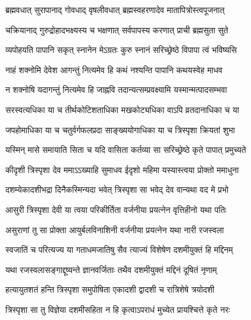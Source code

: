 \twolineshloka
{ब्रह्मवधात् सुरापानाद् गोवधाद् वृषलीवधात्}
{ब्रह्मस्वहरणादेव मातापित्रोस्त्वपूजनात्}%

\twolineshloka
{चक्रियानाद् गुरुद्रोहादभक्ष्यस्य च भक्षणात्}
{सर्वपापस्य करणात् प्राची ब्रह्मसुता सुते}%

\twolineshloka
{व्यपोहयति पापानि सकृत् स्नानेन मेऽग्रतः}
{कुरु स्नानं सरिच्छ्रेष्ठे विपापा त्वं भविष्यसि}%


\twolineshloka
{नाहं शक्नोमि देवेश आगन्तुं नित्यमेव हि}
{कथं नश्यन्ति पापानि कथयस्वेह माधव}%


\twolineshloka
{न शक्नोषि यदागन्तुं नित्यमेव हि जाह्नवि}
{तदान्यत्सम्प्रवक्ष्यामि यस्मान्मत्पादसम्भवा}%

\twolineshloka
{सरस्वत्यधिका या च तीर्थकोटिशताधिका}
{मखकोट्यधिका वाऽपि व्रतदानाधिका च या}%

\twolineshloka
{जपहोमाधिका या च चतुर्वर्गफलप्रदा}
{साङ्ख्ययोगाधिका या च त्रिस्पृशा क्रियतां शुभा}%

\twolineshloka
{यस्मिन् मासे समायाति सिता च यदि वासिता}
{कर्तव्या सा सरिच्छ्रेष्ठे कृते पापात् प्रमुच्यते}%


\twolineshloka
{कीदृशी त्रिस्पृशा देव ममाऽऽख्याहि सुमाधव}
{ईदृशो महिमा यस्यास्त्वया प्रोक्तो ममाधुना}%

\twolineshloka
{दशम्येकादशीभद्रा दिनैकस्मिन्यदा भवेत्}
{त्रिस्पृशा सा भवेद् देव वान्यथा वद मे प्रभो}%


\twolineshloka
{आसुरी त्रिस्पृशा देवी या त्वया परिकीर्तिता}
{वर्जनीया प्रयत्नेन वृत्तिहीनो यथा पतिः}%

\twolineshloka
{असुराणां तु सा प्रोक्ता आयुर्बलविनाशिनी}
{वर्जनीया प्रयत्नेन यथा नारी रजस्वला}%

\twolineshloka
{स्वजातिं च परित्यज्य या गताधमजातिषु}
{सैव त्याज्यं विशेषेण दशमीयुक्तं हि मद्दिनम्}%

\twolineshloka
{यथा रजस्वलासङ्गाद्दूष्यन्ते ज्ञानवर्जिताः}
{तथैव दशमीयुक्तं मद्दिनं दूषितं नृणाम्}%

\twolineshloka
{हत्यायुतशतं हन्ति त्रिस्पृशा समुपोषिता}
{एकादशी द्वादशी च रात्रिशेषे त्रयोदशी}%

\twolineshloka
{त्रिस्पृशा सा तु विज्ञेया दशमीसहिता न हि}
{कृत्वाऽपराधं मुच्येत प्रायश्चित्ते कृते नरः}%

